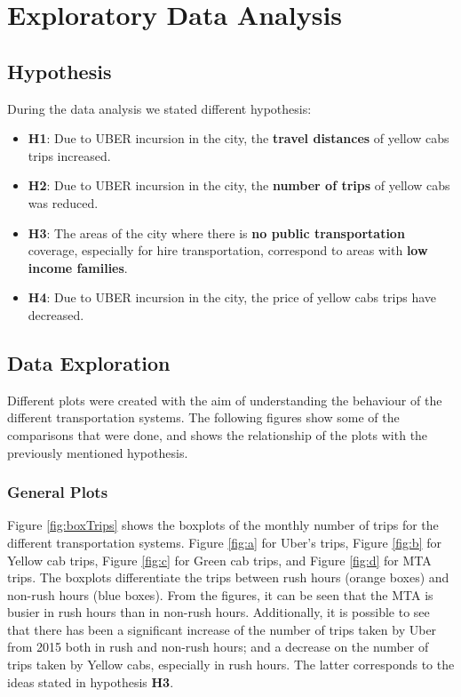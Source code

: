 \section{Exploratory Data Analysis}
\label{sec:datAnalisys}

\subsection{Hypothesis}

During the data analysis we stated different hypothesis:

\begin{itemize}

\item \textbf{H1}: Due to UBER incursion in the city, the \textbf{travel distances} of yellow cabs trips increased.

\item \textbf{H2}: Due to UBER incursion in the city, the \textbf{number of trips} of yellow cabs was reduced.

\item \textbf{H3}: The areas of the city where there is \textbf{no public transportation} coverage, especially for hire transportation, correspond to areas with \textbf{low income families}. 

\item \textbf{H4}: Due to UBER incursion in the city, the price of yellow cabs trips have decreased. 

\end{itemize}


\subsection{Data Exploration}

Different plots were created with the aim of understanding the behaviour of the different transportation systems. The following figures show some of the comparisons that were done, and shows the relationship of the plots with the previously mentioned hypothesis.

\subsubsection{General Plots}

Figure \ref{fig:boxTrips} shows the boxplots of the monthly number of trips for the different transportation systems. Figure \ref{fig:a} for Uber's trips, Figure \ref{fig:b} for Yellow cab trips, Figure \ref{fig:c} for Green cab trips, and Figure \ref{fig:d} for MTA trips. The boxplots differentiate the trips between rush hours (orange boxes) and non-rush hours (blue boxes). From the figures, it can be seen that the MTA is busier in rush hours than in non-rush hours. Additionally, it is possible to see that there has been a significant increase of the number of trips taken by Uber from 2015 both in rush and non-rush hours; and a decrease on the number of trips taken by Yellow cabs, especially in rush hours. The latter corresponds to the ideas stated in hypothesis \textbf{H3}.


